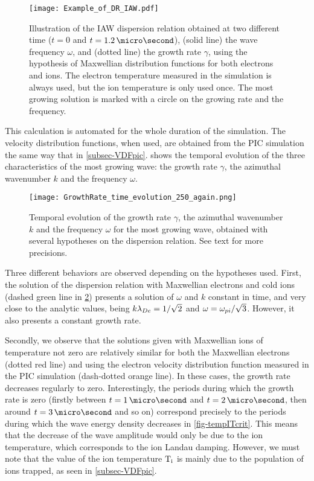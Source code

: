   \begin{figure}[hbt]
    \centering
    \texttt{[image: Example\_of\_DR\_IAW.pdf]}
    \caption{Illustration of the \acs{IAW} dispersion relation obtained at two different time ($t=0$ and $t=1.2\,\micro\second$), (solid line) the wave frequency $\omega$, and (dotted line) the growth rate $\gamma$, using the hypothesis of Maxwellian distribution functions for both electrons and ions. The electron temperature measured in the simulation is always used, but the ion temperature is only used once. The most growing solution is marked with a circle on the growing rate and the frequency.}
    \label{fig-Example_of_DR_IAW}
  \end{figure}
  
  
  This calculation is automated for the whole duration of the simulation.
  The velocity distribution functions, when used, are obtained from the \ac{PIC} simulation the same way that in \cref{subsec-VDFpic}.
   shows the temporal evolution of the three characteristics of the most growing wave: the growth rate $\gamma$, the azimuthal wavenumber $k$ and the frequency $\omega$.
  \begin{figure}[hbt]
    \centering
    \texttt{[image: GrowthRate\_time\_evolution\_250\_again.png]}  %
    \caption{Temporal evolution of the growth rate $\gamma$, the azimuthal wavenumber $k$ and the frequency $\omega$ for the most growing wave, obtained with several hypotheses on the dispersion relation. See text for more precisions. }
    \label{fig-time_wave}
  \end{figure}
  
  Three different behaviors are observed depending on the hypotheses used.
  First, the solution of the dispersion relation with Maxwellian electrons and cold ions (dashed green line in \cref{fig-time_wave}) presents a solution of $\omega$ and $k$ constant in time, and very close to the analytic values, being $k \lambda_{De} = 1/\sqrt{2}$ and $\omega = \omega_{pi}/\sqrt{3}$.
  However, it also presents a constant growth rate.
  
  Secondly, we observe that the solutions given with Maxwellian ions of temperature not zero are relatively similar for both the Maxwellian electrons  (dotted red line) and using the electron velocity distribution function measured in the \ac{PIC} simulation (dash-dotted orange line).
  In these cases, the growth rate decreases regularly to zero.
  Interestingly, the periods during which the growth rate is zero (firstly between $t=1\,\micro\second$ and $t=2\,\micro\second$, then around $t=3\,\micro\second$ and so on) correspond precisely to the periods during which the wave energy density decreases in \cref{fig-tempITcrit}.
  This means that the decrease of the wave amplitude would only be due to the ion temperature, which corresponds to the ion Landau damping.
  However, we must note that the value of the ion temperature $\mathrm{T_i}$ is mainly due to the population of ions trapped, as seen in \cref{subsec-VDFpic}.

